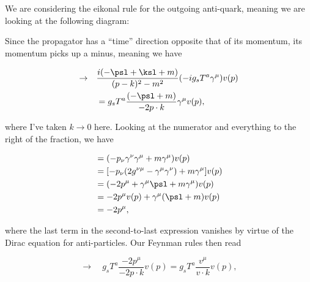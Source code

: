 \section{}

We are considering the eikonal rule for the outgoing anti-quark, meaning we are looking at the following diagram:

\begin{center}
\end{center}

Since the propagator has a ``time'' direction opposite that of its momentum, its momentum picks up a minus, meaning we have

\begin{align}
  \rightarrow\quad & \frac{i(-\psl + \ksl + m)}{(p - k)^2 - m^2} (-ig_sT^a\gamma^\mu)v(p) \\
  &= g_sT^a \frac{(-\psl + m)}{-2p \cdot k} \gamma^\mu v(p),
\end{align}

where I've taken $k \rightarrow 0$ here. Looking at the numerator and everything to the right of the fraction, we have

\begin{align}
  &= (-p_\nu\gamma^\nu\gamma^\mu + m\gamma^\mu)v(p) \\
  &= [-p_\nu(2g^{\nu\mu} - \gamma^\mu\gamma^\nu) + m\gamma^\mu]v(p) \\
  &= (-2p^\mu + \gamma^\mu\psl + m\gamma^\mu)v(p) \\
  &= -2p^\mu v(p) + \gamma^\mu(\psl + m)v(p) \\
  &= -2p^\mu,
\end{align}

where the last term in the second-to-last expression vanishes by virtue of the Dirac equation for anti-particles. Our Feynman rules then read

\begin{equation}
  \rightarrow\quad g_sT^a \frac{-2p^\mu}{-2p \cdot k} v(p) = g_sT^a \frac{v^\mu}{v \cdot k} v(p),
\end{equation}

